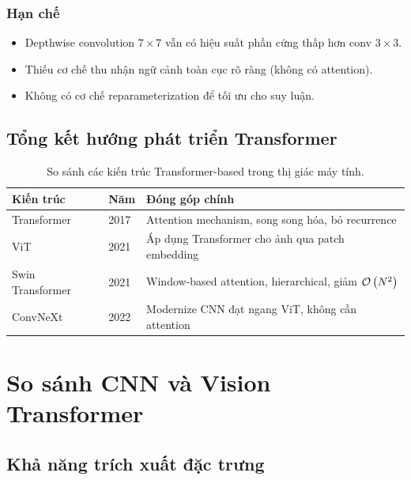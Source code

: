 \subsubsection*{Hạn chế}
\begin{itemize}
    \item Depthwise convolution $7 \times 7$ vẫn có hiệu suất phần cứng thấp hơn conv $3 \times 3$.
    \item Thiếu cơ chế thu nhận ngữ cảnh toàn cục rõ ràng (không có attention).
    \item Không có cơ chế reparameterization để tối ưu cho suy luận.
\end{itemize}

\subsection{Tổng kết hướng phát triển Transformer}
\label{subsec:transformer_summary}

\begin{table}[H]
\centering
\caption{So sánh các kiến trúc Transformer-based trong thị giác máy tính.}
\label{tab:transformer_evolution}
\begin{tabularx}{\textwidth}{l l X}
\toprule
\textbf{Kiến trúc} & \textbf{Năm} & \textbf{Đóng góp chính} \\
\midrule
Transformer & 2017 & Attention mechanism, song song hóa, bỏ recurrence \\
ViT & 2021 & Áp dụng Transformer cho ảnh qua patch embedding \\
Swin Transformer & 2021 & Window-based attention, hierarchical, giảm $\mathcal{O}\left(N^2\right)$ \\
ConvNeXt & 2022 & Modernize CNN đạt ngang ViT, không cần attention \\
\bottomrule
\end{tabularx}
\end{table}

\section{So sánh CNN và Vision Transformer}
\label{sec:cnn_vs_vit}

\subsection{Khả năng trích xuất đặc trưng}

